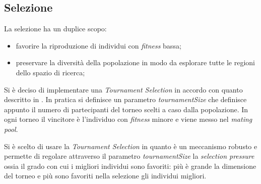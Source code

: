 \subsection{Selezione}
La selezione ha un duplice scopo:
\begin{itemize}
\item favorire la riproduzione di individui con \emph{fitness} bassa;
\item preservare la diversità della popolazione in modo da esplorare tutte le regioni dello spazio di ricerca;
\end{itemize}
Si è deciso di implementare una \emph{Tournament Selection} in accordo con quanto descritto in \cite{TournamentSelection}. In pratica si definisce un parametro \emph{tournamentSize} che definisce appunto il numero di partecipanti del torneo scelti a caso dalla popolazione. In ogni torneo il vincitore è l'individuo con \emph{fitness} minore e viene messo nel \emph{mating pool}.

Si è scelto di usare la \emph{Tournament Selection} in quanto è un meccanismo robusto e permette di regolare attraverso il parametro \emph{tournamentSize} la \emph{selection pressure} ossia il grado con cui i migliori individui sono favoriti: più è grande la dimensione del torneo e più sono favoriti nella selezione gli individui migliori.

